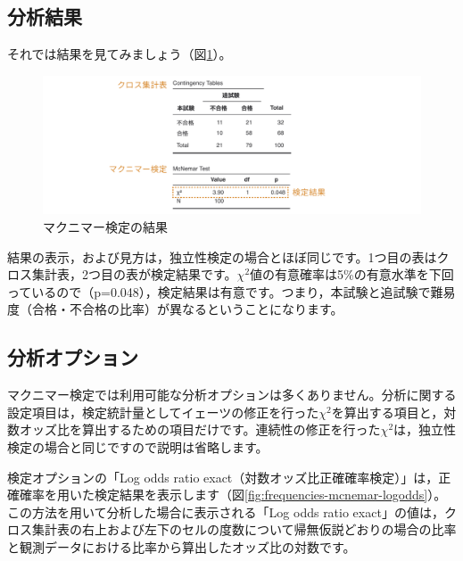 \documentclass[
  12pt,
  a5jpaper,
  lualatex, ja=standard]{bxjsbook}
\begin{document}
\hypertarget{sub:frequencies-mcnemar-results}{%
\subsection{分析結果}\label{sub:frequencies-mcnemar-results}}

それでは結果を見てみましょう（図\ref{fig:frequencies-mcnemar-results}）。

\begin{figure}[!ht]

{\centering \includegraphics[width=1\linewidth]{images/frequencies/mcnemar-results} 

}

\caption{マクニマー検定の結果}\label{fig:frequencies-mcnemar-results}
\end{figure}

結果の表示，および見方は，独立性検定の場合とほぼ同じです。1つ目の表はクロス集計表，2つ目の表が検定結果です。\(\chi^2\)値の有意確率は5\%の有意水準を下回っているので（p=0.048），検定結果は有意です。つまり，本試験と追試験で難易度（合格・不合格の比率）が異なるということになります。

\hypertarget{sub:frequencies-mcnemar-options}{%
\subsection{分析オプション}\label{sub:frequencies-mcnemar-options}}

マクニマー検定では利用可能な分析オプションは多くありません。分析に関する設定項目は，検定統計量としてイェーツの修正を行った\(\chi^2\)を算出する項目と，対数オッズ比を算出するための項目だけです。連続性の修正を行った\(\chi^2\)は，独立性検定の場合と同じですので説明は省略します。

検定オプションの「Log odds ratio exact（対数オッズ比正確確率検定）」は，正確確率を用いた検定結果を表示します（図\ref{fig:frequencies-mcnemar-logodds}）。この方法を用いて分析した場合に表示される「Log odds ratio exact」の値は，クロス集計表の右上および左下のセルの度数について帰無仮説どおりの場合の比率と観測データにおける比率から算出したオッズ比の対数です。
\end{document}
